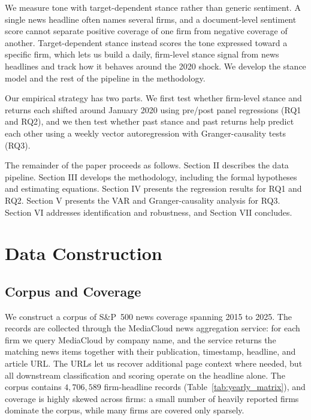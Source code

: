 \documentclass[conference]{IEEEtran}
\begin{document}
We measure tone with target-dependent stance rather than generic sentiment. A single news headline often names several firms, and a document-level sentiment score cannot separate positive coverage of one firm from negative coverage of another. Target-dependent stance instead scores the tone expressed toward a specific firm, which lets us build a daily, firm-level stance signal from news headlines and track how it behaves around the 2020 shock. We develop the stance model and the rest of the pipeline in the methodology.

Our empirical strategy has two parts. We first test whether firm-level stance and returns each shifted around January 2020 using pre/post panel regressions (RQ1 and RQ2), and we then test whether past stance and past returns help predict each other using a weekly vector autoregression with Granger-causality tests (RQ3).

The remainder of the paper proceeds as follows. Section II describes the data pipeline. Section III develops the methodology, including the formal hypotheses and estimating equations. Section IV presents the regression results for RQ1 and RQ2. Section V presents the VAR and Granger-causality analysis for RQ3. Section VI addresses identification and robustness, and Section VII concludes.

\section{Data Construction}
\subsection{Corpus and Coverage}
We construct a corpus of S\&P~500 news coverage spanning 2015 to 2025. The
records are collected through the MediaCloud news aggregation service: for each
firm we query MediaCloud by company name, and the service returns the matching
news items together with their publication, timestamp, headline, and article URL.
The URLs let us recover additional page context where needed, but all downstream
classification and scoring operate on the headline alone. The corpus contains
$4{,}706{,}589$ firm-headline records (Table~\ref{tab:yearly_matrix}), and
coverage is highly skewed across firms: a small number of heavily reported firms
dominate the corpus, while many firms are covered only sparsely.
\end{document}
